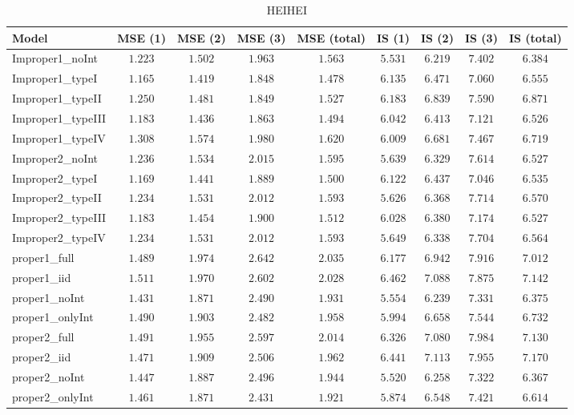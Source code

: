 \begin{table}

\caption{\label{tab:model-choice-sc9}HEIHEI}
\centering
\begin{tabular}{lcccccccc}
\hline
Model  & MSE (1) & MSE (2) & MSE (3) & MSE (total) & IS (1) & IS (2) & IS (3) & \multicolumn{1}{c}{IS (total)} \\ 
\hline
Improper1_noInt  & $1.223$ & $1.502$ & $1.963$ & $1.563$ & $5.531$ & $6.219$ & $7.402$ & $6.384$ \\
Improper1_typeI  & $1.165$ & $1.419$ & $1.848$ & $1.478$ & $6.135$ & $6.471$ & $7.060$ & $6.555$ \\
Improper1_typeII  & $1.250$ & $1.481$ & $1.849$ & $1.527$ & $6.183$ & $6.839$ & $7.590$ & $6.871$ \\
Improper1_typeIII  & $1.183$ & $1.436$ & $1.863$ & $1.494$ & $6.042$ & $6.413$ & $7.121$ & $6.526$ \\
Improper1_typeIV  & $1.308$ & $1.574$ & $1.980$ & $1.620$ & $6.009$ & $6.681$ & $7.467$ & $6.719$ \\
Improper2_noInt  & $1.236$ & $1.534$ & $2.015$ & $1.595$ & $5.639$ & $6.329$ & $7.614$ & $6.527$ \\
Improper2_typeI  & $1.169$ & $1.441$ & $1.889$ & $1.500$ & $6.122$ & $6.437$ & $7.046$ & $6.535$ \\
Improper2_typeII  & $1.234$ & $1.531$ & $2.012$ & $1.593$ & $5.626$ & $6.368$ & $7.714$ & $6.570$ \\
Improper2_typeIII  & $1.183$ & $1.454$ & $1.900$ & $1.512$ & $6.028$ & $6.380$ & $7.174$ & $6.527$ \\
Improper2_typeIV  & $1.234$ & $1.531$ & $2.012$ & $1.593$ & $5.649$ & $6.338$ & $7.704$ & $6.564$ \\
proper1_full  & $1.489$ & $1.974$ & $2.642$ & $2.035$ & $6.177$ & $6.942$ & $7.916$ & $7.012$ \\
proper1_iid  & $1.511$ & $1.970$ & $2.602$ & $2.028$ & $6.462$ & $7.088$ & $7.875$ & $7.142$ \\
proper1_noInt  & $1.431$ & $1.871$ & $2.490$ & $1.931$ & $5.554$ & $6.239$ & $7.331$ & $6.375$ \\
proper1_onlyInt  & $1.490$ & $1.903$ & $2.482$ & $1.958$ & $5.994$ & $6.658$ & $7.544$ & $6.732$ \\
proper2_full  & $1.491$ & $1.955$ & $2.597$ & $2.014$ & $6.326$ & $7.080$ & $7.984$ & $7.130$ \\
proper2_iid  & $1.471$ & $1.909$ & $2.506$ & $1.962$ & $6.441$ & $7.113$ & $7.955$ & $7.170$ \\
proper2_noInt  & $1.447$ & $1.887$ & $2.496$ & $1.944$ & $5.520$ & $6.258$ & $7.322$ & $6.367$ \\
proper2_onlyInt  & $1.461$ & $1.871$ & $2.431$ & $1.921$ & $5.874$ & $6.548$ & $7.421$ & $6.614$ \\
\hline 
\end{tabular}


\end{table}